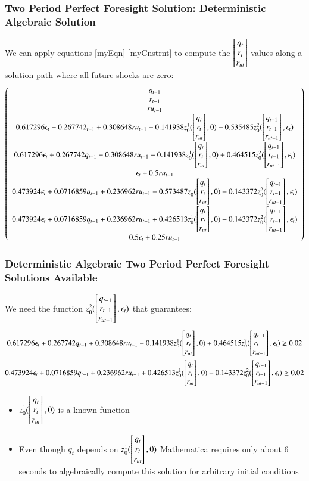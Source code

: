 \documentclass{beamer}
\begin{document}
    \begin{frame}
      \frametitle{Two Period Perfect Foresight Solution: Deterministic Algebraic Solution}
We can apply equations \ref{myEqn}-\ref{myCnstrnt} to compute the $\begin{bmatrix} q_t\\r_{t}\\r_{ut} \end{bmatrix}$ values along a solution path where all future shocks are zero:
{\tiny
      \begin{gather*}
           \left(
   \begin{array}{c}
    q_{t-1} \\
    r_{t-1} \\
    ru_{t-1} \\
 0.617296 \epsilon_t+0.267742 _{t-1}+0.308648 ru_{t-1}-0.141938
       z_0^1(\begin{bmatrix} q_t\\r_{t}\\r_{ut} \end{bmatrix},0)-0.535485 z_0^2(\begin{bmatrix} q_{t-1}\\r_{t-1}\\r_{ut-1} \end{bmatrix},\epsilon_t) \\
    0.617296 \epsilon_t+0.267742 q_{t-1}+0.308648 ru_{t-1}-0.141938
      z_0^1(\begin{bmatrix} q_t\\r_{t}\\r_{ut} \end{bmatrix},0)+0.464515 z_0^2(\begin{bmatrix} q_{t-1}\\r_{t-1}\\r_{ut-1} \end{bmatrix},\epsilon_t) \\
    \epsilon_t+0.5 ru_{t-1} \\
    0.473924 \epsilon_t+0.0716859 q_{t-1}+0.236962 ru_{t-1}-0.573487
      z_0^1(\begin{bmatrix} q_t\\r_{t}\\r_{ut} \end{bmatrix},0)-0.143372 z_0^2(\begin{bmatrix} q_{t-1}\\r_{t-1}\\r_{ut-1} \end{bmatrix},\epsilon_t) \\
    0.473924 \epsilon_t+0.0716859 q_{t-1}+0.236962 ru_{t-1}+0.426513
      z_0^1(\begin{bmatrix} q_t\\r_{t}\\r_{ut} \end{bmatrix},0)-0.143372 z_0^2(\begin{bmatrix} q_{t-1}\\r_{t-1}\\r_{ut-1} \end{bmatrix},\epsilon_t) \\
    0.5 \epsilon_t+0.25 ru_{t-1} 
   \end{array}
   \right)
      \end{gather*}
}

    \end{frame}

    \begin{frame}
\frametitle{Deterministic Algebraic Two Period Perfect Foresight Solutions  Available}

We  need the function {\small $z_0^2(\begin{bmatrix} q_{t-1}\\r_{t-1}\\r_{ut-1} \end{bmatrix},\epsilon_t)$ }that guarantees:
{\tiny 
\begin{gather*}
    0.617296 \epsilon_t+0.267742 q_{t-1}+0.308648 ru_{t-1}-0.141938
      z_0^1(\begin{bmatrix} q_t\\r_{t}\\r_{ut} \end{bmatrix},0)+0.464515 z_0^2(\begin{bmatrix} q_{t-1}\\r_{t-1}\\r_{ut-1} \end{bmatrix},\epsilon_t) \ge 0.02\\  
    0.473924 \epsilon_t+0.0716859 q_{t-1}+0.236962 ru_{t-1}+0.426513
      z_0^1(\begin{bmatrix} q_t\\r_{t}\\r_{ut} \end{bmatrix},0)-0.143372 z_0^2(\begin{bmatrix} q_{t-1}\\r_{t-1}\\r_{ut-1} \end{bmatrix},\epsilon_t)  \ge 0.02 \\
\end{gather*}
}
\begin{itemize}
\item {\small $z_0^1(\begin{bmatrix} q_t\\r_{t}\\r_{ut} \end{bmatrix},0)$ } is a known function
\item Even though $q_t$ depends on {\small $z_0^1(\begin{bmatrix} q_t\\r_{t}\\r_{ut} \end{bmatrix},0)$ } Mathematica requires only about 6 seconds to algebraically compute this solution for arbitrary initial conditions
\end{itemize}
    \end{frame}
\end{document}
